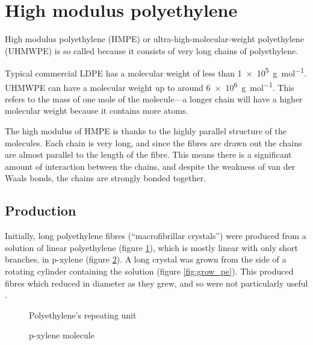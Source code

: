 \section{High modulus polyethylene}
High modulus polyethylene (HMPE) or ultra-high-molecular-weight polyethylene (UHMWPE) is so called because it consists of very long chains of polyethylene.

Typical commercial LDPE has a molecular weight of less than \SI{1e5}{\gram\per\mole}. UHMWPE can have a molecular weight up to around \SI{6e6}{\gram\per\mole}. This refers to the mass of one mole of the molecule---a longer chain will have a higher molecular weight because it contains more atoms.

The high modulus of HMPE is thanks to the highly parallel structure of the molecules. Each chain is very long, and since the fibres are drawn out the chains are almost parallel to the length of the fibre. This means there is a significant amount of interaction between the chains, and despite the weakness of van der Waals bonds, the chains are strongly bonded together.

\subsection{Production}
Initially, long polyethylene fibres (``macrofibrillar crystals'') were produced from a solution of linear polyethylene (figure \ref{fig:pe}), which is mostly linear with only short branches, in p-xylene (figure \ref{fig:p-xylene}). A long crystal was grown from the side of a rotating cylinder containing the solution (figure \ref{fig:grow_pe}). This produced fibres which reduced in diameter as they grew, and so were not particularly useful .


\begin{figure}
\centering
{}
\caption{Polyethylene's repeating unit}
\label{fig:pe}
\end{figure}

\begin{figure}
\centering
{}
\caption{p-xylene molecule}
\label{fig:p-xylene}
\end{figure}

